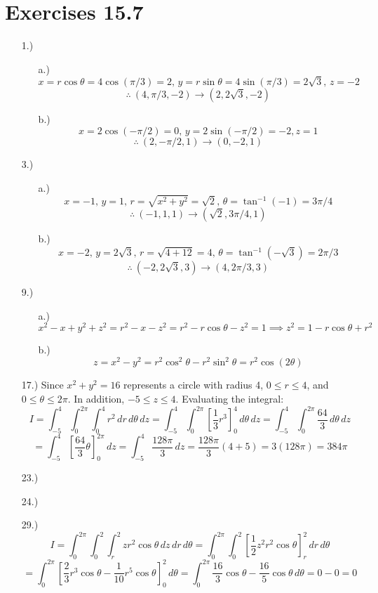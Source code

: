 \documentclass[12pt]{article}
\newcommand{\bracks}[1]{\left[#1\right]}
\begin{document}
\section*{Exercises 15.7}
\begin{itemize}
    \item [1.)] \begin{itemize}
        \item [a.)] \[x=r\cos\theta=4\cos(\pi/3)=2,\,y=r\sin\theta=4\sin(\pi/3)=2\sqrt3,\,z=-2\]
        \[\therefore\ (4,\pi/3,-2)\to(2,2\sqrt3,-2)\]

        \item [b.)] \[x=2\cos(-\pi/2)=0,\,y=2\sin(-\pi/2)=-2,z=1\]
        \[\therefore\ (2,-\pi/2,1)\to(0,-2,1)\]
    \end{itemize}

    \item [3.)] \begin{itemize}
        \item [a.)] \[x=-1,\,y=1,\,r=\sqrt{x^2+y^2}=\sqrt{2},\,\theta=\tan^{-1}(-1)=3\pi/4\]
        \[\therefore\ (-1,1,1)\to(\sqrt2,3\pi/4,1)\]

        \item [b.)] \[x=-2,\,y=2\sqrt3,\,r=\sqrt{4+12}=4,\,\theta=\tan^{-1}(-\sqrt3)=2\pi/3\]
        \[\therefore\ (-2,2\sqrt3,3)\to(4,2\pi/3,3)\]
    \end{itemize}

    \item [9.)] \begin{itemize}
        \item [a.)] \[x^2-x+y^2+z^2=r^2-x-z^2=r^2-r\cos\theta-z^2=1\implies z^2=1-r\cos\theta+r^2\]

        \item [b.)] \[z=x^2-y^2=r^2\cos^2\theta-r^2\sin^2\theta=r^2\cos(2\theta)\]
    \end{itemize}

    \item [17.)] Since $x^2+y^2=16$ represents a circle with radius 4, $0\leq r\leq4$, and $0\leq\theta\leq2\pi$. In addition, $-5\leq z\leq4$. Evaluating the integral:
    \[I=\int^4_{-5}\int^{2\pi}_0\int^4_0r^2\,dr\,d\theta\,dz=\int^4_{-5}\int^{2\pi}_0\bracks{\frac{1}{3}r^3}^4_0\,d\theta\,dz=\int^4_{-5}\int^{2\pi}_0\frac{64}{3}\,d\theta\,dz\]
    \[=\int^4_{-5}\bracks{\frac{64}{3}\theta}^{2\pi}_0\,dz=\int^4_{-5}\frac{128\pi}{3}\,dz=\frac{128\pi}{3}(4+5)=3(128\pi)=384\pi\]

    \item [23.)] 

    \item [24.)]

    \item [29.)] \[I=\int^{2\pi}_0\int^2_0\int^2_rzr^2\cos\theta\,dz\,dr\,d\theta=\int^{2\pi}_0\int^2_0\bracks{\frac{1}{2}z^2r^2\cos\theta}^2_r\,dr\,d\theta\]
    \[=\int^{2\pi}_0\bracks{\frac{2}{3}r^3\cos\theta-\frac{1}{10}r^5\cos\theta}^2_0\,d\theta=\int^{2\pi}_0\frac{16}{3}\cos\theta-\frac{16}{5}\cos\theta\,d\theta=0-0=0\]

\end{itemize}
\end{document}
